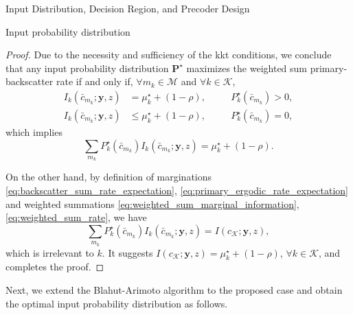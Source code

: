 \documentclass[journal]{IEEEtran}
\begin{document}
\begin{section}{Input Distribution, Decision Region, and Precoder Design}
\begin{subsection}{Input probability distribution}
\begin{proof}
				Due to the necessity and sufficiency of the \gls{kkt} conditions, we conclude that any input probability distribution $\boldsymbol{P}^{\star}$ maximizes the weighted sum primary-backscatter rate if and only if, $\forall m_k \in \mathcal{M}$ and $\forall k \in \mathcal{K}$,
				\begin{subequations}
					\begin{alignat}{2}
						I_k(\bar{c}_{m_k};\boldsymbol{y},z) & = \mu_k^{\star} + (1 - \rho), \quad && P_k^{\star}(\bar{c}_{m_k}) > 0,\label{eq:probable_states_marginal}\\
						I_k(\bar{c}_{m_k};\boldsymbol{y},z) & \le \mu_k^{\star} + (1 - \rho), \quad && P_k^{\star}(\bar{c}_{m_k}) = 0,\label{eq:dropped_states_marginal}
					\end{alignat}
				\end{subequations}
				which implies
				\begin{equation}
					\sum_{m_k} P_k^{\star}(\bar{c}_{m_k}) I_k(\bar{c}_{m_k};\boldsymbol{y},z) = \mu_k^{\star} + (1 - \rho).
				\end{equation}

				On the other hand, by definition of marginations \eqref{eq:backscatter_sum_rate_expectation}, \eqref{eq:primary_ergodic_rate_expectation} and weighted summations \eqref{eq:weighted_sum_marginal_information}, \eqref{eq:weighted_sum_rate}, we have
				\begin{equation}
					\sum_{m_k} P_k^{\star}(\bar{c}_{m_k}) I_k(\bar{c}_{m_k};\boldsymbol{y},z) = I(c_{\mathcal{K}};\boldsymbol{y},z),
				\end{equation}
				which is irrelevant to $k$. It suggests $I(c_{\mathcal{K}};\boldsymbol{y},z) = \mu_k^{\star} + (1 - \rho)$, $\forall k \in \mathcal{K}$, and completes the proof.
			\end{proof}

			Next, we extend the Blahut-Arimoto algorithm to the proposed case and obtain the optimal input probability distribution as follows.


\end{subsection}
\end{section}
\end{document}
